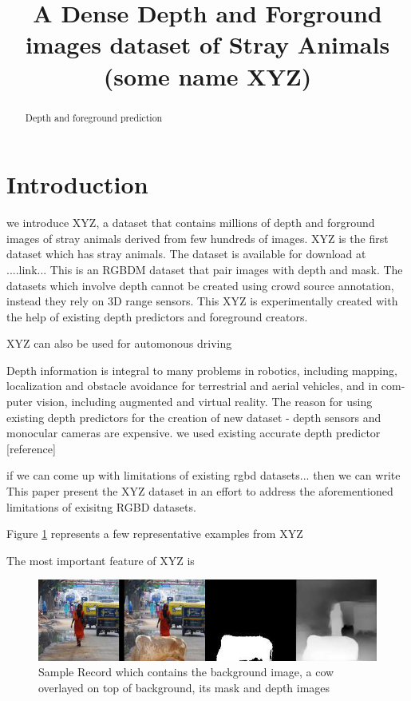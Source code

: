 \documentclass{article}
\title{A Dense Depth and Forground images dataset of Stray Animals (some name XYZ)}
\begin{document}
\maketitle

\begin{abstract}
Depth and foreground prediction


\end{abstract}

 

\section{Introduction}

we introduce XYZ, a dataset that contains millions of depth and forground images of stray animals derived from few hundreds of images. XYZ is the first dataset which has stray animals. The dataset is available for download at ....link...
This is an RGBDM dataset that pair images with depth and mask. The datasets which involve depth cannot be created using crowd source annotation, instead they rely on 3D range sensors. This XYZ is experimentally created with the help of existing depth predictors and foreground creators.

XYZ can also be used for automonous driving


Depth information is integral to many problems in
robotics, including mapping, localization and obstacle avoidance for terrestrial and aerial vehicles, and in com- puter vision, including augmented and virtual reality\cite{marchand2015pose}.
The reason for using existing depth predictors for the creation of new dataset - depth sensors and monocular cameras are expensive. we used existing accurate depth predictor [reference]

if we can come up with limitations of existing rgbd datasets... then we can write This paper present the XYZ dataset in an effort to address the aforementioned limitations of exisitng RGBD datasets.

Figure \ref{fig:samplerecord} represents a few representative examples from XYZ

The most important feature of XYZ is 

\begin{figure}[h!]
\centering
  \includegraphics[width=1\textwidth]{samplerecord.png}
  \caption{Sample Record which contains the background image, a cow overlayed on top of background, its mask and depth images}
  \label{fig:samplerecord}
\end{figure}
\end{document}
